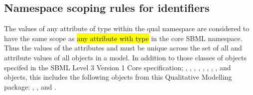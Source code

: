 \subsection{Namespace scoping rules for identifiers}
\label{sec:ns-id}

The values of any  attribute  of type  within the qual namespace are considered to have the same scope as \hl{any  attribute with type } in the core SBML namespace. Thus the values of the attributes
   and  must be unique across the set of all  and
   attribute values of all objects in a model. In addition to those classes of objects specifed in the SBML Level 3 Version 1 Core specification;
  \Model, \FunctionDefinition, \Compartment,
  \Species, \Reaction, \SpeciesReference, \ModifierSpeciesReference,
  \Event, and \Parameter objects, this includes the following objects from this Qualitative Modelling package: \QualitativeSpecies, \Transition, 
  \Input and \Output.
